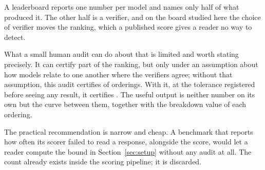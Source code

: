 A leaderboard reports one number per model and names only half of what produced it. The other
half is a verifier, and on the board studied here the choice of verifier moves the ranking,
which a published score gives a reader no way to detect.

What a small human audit can do about that is limited and worth stating precisely. It can
certify part of the ranking, but only under an assumption about how models relate to one
another where the verifiers agree; without that assumption, this audit certifies
\CertNoPooling{} of \NumOrderings{} orderings. With it, at the tolerance registered before
seeing any result, it certifies \CertPrereg{}. The useful output is neither number on its own
but the curve between them, together with the breakdown value of each ordering.

The practical recommendation is narrow and cheap. A benchmark that reports how often its
scorer failed to read a response, alongside the score, would let a reader compute the bound in
Section~\ref{sec:setup} without any audit at all. The count already exists inside the scoring
pipeline; it is discarded.

